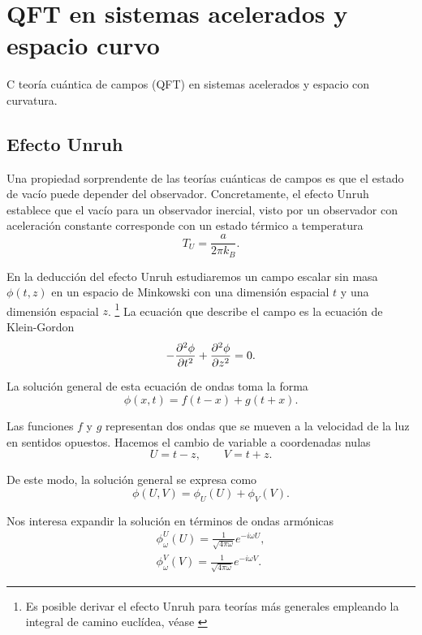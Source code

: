 \chapter{QFT en sistemas acelerados y espacio curvo}
C teoría cuántica de campos (QFT) en sistemas acelerados y espacio con curvatura.

\section{Efecto Unruh}

Una propiedad sorprendente de las teorías cuánticas de campos es que el estado de vacío
puede depender del observador.
Concretamente, el efecto Unruh establece que el vacío para un observador inercial,
visto por un observador con aceleración constante corresponde con un estado térmico a temperatura
\begin{equation}
  T_U=\frac{a}{2\pi k_B}.
\end{equation}

En la deducción del efecto Unruh estudiaremos un campo escalar sin masa $\phi(t,z)$ en un espacio de Minkowski
con una dimensión espacial $t$ y una dimensión espacial $z$.  
\footnote{Es posible derivar el efecto Unruh para teorías más generales empleando la integral
  de camino euclídea, véase \cite{Susskind}}
La ecuación que describe el campo es la ecuación de Klein-Gordon
\begin{equation}
  -\pdv[2]{\phi}{t}+\pdv[2]{\phi}{z}=0.
  \label{eq:kg}
\end{equation}

La solución general de esta ecuación de ondas toma la forma
\begin{equation}
  \phi(x,t)=f(t-x)+g(t+x).
\end{equation}

Las funciones $f$ y $g$ representan dos ondas que se mueven a la velocidad de la luz en sentidos
opuestos. 
Hacemos el cambio de variable a coordenadas nulas
\begin{equation}
  U=t-z,   \qquad V=t+z.
\end{equation}

De este modo, la solución general se expresa como
\begin{equation}
  \phi(U,V)=\phi_U(U)+\phi_V(V).
\end{equation}

Nos interesa expandir la solución en términos de ondas armónicas
\begin{gather}
  \phi_\omega^U(U)=\frac{1}{\sqrt{4\pi\omega}} e^{-i\omega U},  \\
  \phi_\omega^V(V)=\frac{1}{\sqrt{4\pi\omega}} e^{-i\omega V}.
\end{gather}


